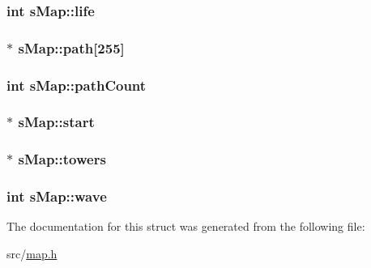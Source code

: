 \subsubsection[{life}]{\setlength{\rightskip}{0pt plus 5cm}int s\+Map\+::life}\label{structs_map_a7ac656eb61c1fd86f15eb6a36df144e8}
\hypertarget{structs_map_a7b410c58024a707229d3c7ec832bdf27}{}
\subsubsection[{path}]{$\ast$ s\+Map\+::path\mbox{[}255\mbox{]}}\label{structs_map_a7b410c58024a707229d3c7ec832bdf27}
\hypertarget{structs_map_a1d8b95b78adb7ddb2381de089e870991}{}
\subsubsection[{path\+Count}]{\setlength{\rightskip}{0pt plus 5cm}int s\+Map\+::path\+Count}\label{structs_map_a1d8b95b78adb7ddb2381de089e870991}
\hypertarget{structs_map_aa50747972cf5e8c17c9927eb8b0439c7}{}
\subsubsection[{start}]{$\ast$ s\+Map\+::start}\label{structs_map_aa50747972cf5e8c17c9927eb8b0439c7}
\hypertarget{structs_map_a93cab5b7e4f3205c43335147e2a3f066}{}
\subsubsection[{towers}]{$\ast$ s\+Map\+::towers}\label{structs_map_a93cab5b7e4f3205c43335147e2a3f066}
\hypertarget{structs_map_abe7b6a265689239f6a6ffbcfd95508be}{}
\subsubsection[{wave}]{\setlength{\rightskip}{0pt plus 5cm}int s\+Map\+::wave}\label{structs_map_abe7b6a265689239f6a6ffbcfd95508be}


The documentation for this struct was generated from the following file\+:\begin{DoxyCompactItemize}
\item 
src/\hyperlink{map_8h}{map.\+h}\end{DoxyCompactItemize}
